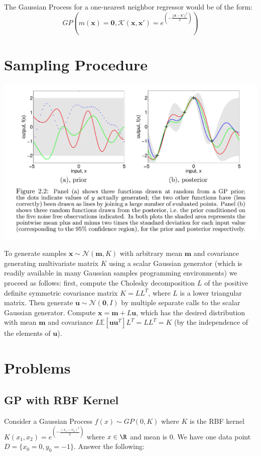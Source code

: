 \documentclass[12pt]{article}
\begin{document}
\noindent The Gaussian Process for a one-nearest neighbor regressor would be of the form: \[ GP \left( m(\mathbf{x}) = \mathbf{0}, \mathcal{K}(\mathbf{x},\mathbf{x'}) = e^{\left( 
- \frac{||\mathbf{x} - \mathbf{x'} ||^2}{2} \right)} \right) \]

\section{Sampling Procedure}
\begin{center}
    \includegraphics[width = \textwidth]{sampling.png}
\end{center}

\noindent To generate samples $\textbf{x} \sim \mathcal{N}(\textbf{m},K)$ with arbitrary mean $\textbf{m}$ and covariance generating multivariate matrix $K$ using a scalar Gaussian generator (which is readily available in many Gaussian samples
programming environments) we proceed as follows: first, compute the Cholesky
decomposition $L$ of the positive definite
symmetric covariance matrix $K = LL^{T}$, where $L$ is a lower triangular
matrix. Then generate $\textbf{u} \sim \mathcal{N}(\textbf{0}, I)$ by multiple separate calls
to the scalar Gaussian generator. Compute $\textbf{x} = \textbf{m} + L\textbf{u}$, which has the desired
distribution with mean $\textbf{m}$ and covariance $L\mathbb{E}[\textbf{uu}^{T}]L^{T} = LL^{T} = K$ (by the
independence of the elements of $\textbf{u}$).

\section{Problems}

\subsection{GP with RBF Kernel}
Consider a Gaussian Process $f(x) \sim GP(0,K)$ where $K$ is the RBF kernel $K(x_1,x_2) = e^{\left( 
- \frac{(x_1 - x_2)^2}{2} \right)}$ where $x \in \R$ and mean is 0. We have one data point $D = \{ x_0 = 0, y_0 = -1 \}$. Answer the following:
\end{document}
